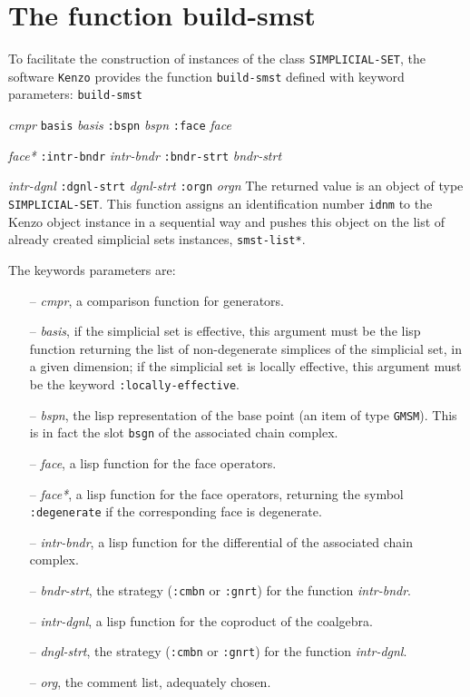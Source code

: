 \section {The function build-smst}

To facilitate the construction of instances of the
class {\tt SIMPLICIAL-SET}, the software {\tt Kenzo} provides the function {\tt build-smst}
defined with keyword parameters:
\vskip 0.40cm
{\tt build-smst}\par
\hspace {1cm}{\tt :cmpr} {\em cmpr} {\tt basis} {\em basis} {\tt :bspn} {\em bspn} {\tt :face} {\em face} \par
\hspace {1cm}{\tt :face*} {\em face*} {\tt :intr-bndr} {\em intr-bndr} {\tt :bndr-strt} {\em bndr-strt} \par
\hspace {1cm}{\tt :intr-dgnl} {\em intr-dgnl}  {\tt :dgnl-strt} {\em dgnl-strt }{\tt :orgn} {\em orgn}
\vskip 0.40cm
The returned value is an object of type {\tt SIMPLICIAL-SET}.
This function assigns an identification number {\tt idnm} to the Kenzo object instance in
a sequential way and pushes this object on the list of already  created simplicial sets instances, {\tt *smst-list*}.
\par
The keywords parameters are:
\begin{itemize}
\item [--] {\em cmpr}, a comparison function for generators.
\item[--] {\em basis}, if the simplicial set is effective, this argument must be the lisp function
returning the  list of non-degenerate simplices  of the simplicial set, in a given dimension;
if the simplicial set is locally effective, this argument must be the keyword {\tt :locally-effective}.
\item[--] {\em bspn}, the lisp representation of the base point (an item of type {\tt GMSM}). This is
in fact the slot {\tt bsgn} of the associated chain complex.
\item[--] {\em face}, a lisp function for the face operators.
\item[--] {\em face*}, a lisp function for the face operators, returning the symbol {\tt :degenerate} if
the corresponding face is degenerate.
\item[--] {\em intr-bndr}, a lisp function for the differential of the associated chain complex.
\item[--] {\em bndr-strt}, the strategy ({\tt :cmbn} or {\tt :gnrt}) for the function {\em intr-bndr}.
\item[--] {\em intr-dgnl}, a lisp function for the coproduct of the coalgebra.
\item[--] {\em dngl-strt}, the strategy ({\tt :cmbn} or {\tt :gnrt}) for the function {\em intr-dgnl}.
\item[--] {\em org}, the comment list, adequately chosen.
\end{itemize}

